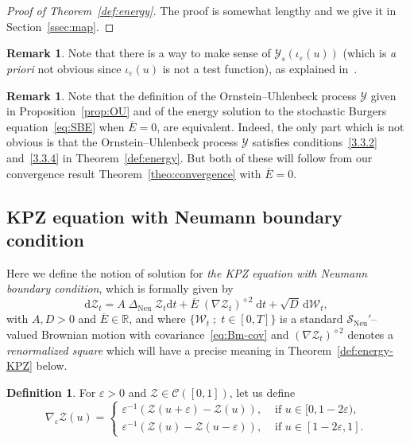 \documentclass[10pt]{amsart}
\theoremstyle{definition}\newtheorem{defi}[theo]{Definition}\newtheorem{rema}[theo]{Remark}\newtheorem{exam}[theo]{Example}\newtheorem{exem}[theo]{Example}\newtheorem{nota}[theo]{Notation}
\DeclareMathOperator{\Neu}{Neu}
\newcommand{\bb}[1]{{\mathbb #1}}
\newcommand{\mc}[1]{{\mathcal #1}}
\renewcommand{\mc}[1]{{\mathcal #1}}
\newcommand{\SN}{\ensuremath{\mc S_{\Neu}}}
\renewcommand{\bar}{\overline}
\newcommand*{\dd}{\mathrm{d}}
\newcommand*{\dt}{\dd t}
\begin{document}
\begin{proof}[Proof of Theorem~\ref{def:energy}] The proof is somewhat lengthy and we give it in Section~\ref{ssec:map}.
\end{proof}

\begin{rema}
Note that there is a way to make sense of $\mc Y_s(\iota_\varepsilon(u))$ (which is \emph{a priori} not obvious since $\iota_\varepsilon(u)$ is not a test function), as explained in~\cite[Remark~4]{gj2014}.
\end{rema}

\begin{rema}
Note that the definition of the Ornstein--Uhlenbeck process $\mc Y$ given in Proposition~\ref{prop:OU} and of the energy solution to the stochastic Burgers equation~\eqref{eq:SBE} when $\bar E=0$, are equivalent. Indeed, the only part which is not obvious is that the Ornstein--Uhlenbeck process $\mc Y$ satisfies conditions~\eqref{3.3.2} and~\eqref{3.3.4} in Theorem~\ref{def:energy}. But both of these will follow from our convergence result Theorem~\ref{theo:convergence} with $\bar E=0$.
\end{rema}

\subsection{KPZ equation with Neumann boundary condition}\label{ssec:kpz}
Here we define the notion of solution for \emph{the KPZ equation with Neumann boundary condition}, which is formally given by
\begin{equation}\label{eq:KPZ}
\dd\mc Z_t = A \;\Delta_{\Neu}\; \mc Z_t \dt + \bar{E}\; (\nabla \mc Z_t)^{\diamond 2} \;\dt + \sqrt{D} \,\dd\mc W_t,
\end{equation}
with $A,D > 0$ and $\bar{E} \in \bb R$, and where $\{\mc W_t\; ; \; t\in[0,T]\}$ is a standard $\SN'$--valued Brownian motion with covariance~\eqref{eq:Bm-cov} and $(\nabla \mc Z_t)^{\diamond 2}$ denotes a \emph{renormalized square} which will have a precise meaning in Theorem~\ref{def:energy-KPZ} below.
\begin{defi}

For $\varepsilon>0$ and $\mc Z\in\mc C([0,1])$, let us define
\begin{equation}\label{eq:nablah}
\nabla_{\varepsilon} \mc Z (u) =
\begin{cases}
\varepsilon^{-1} (\mc Z (u + \varepsilon) - \mc Z (u)), & \text{ if } u \in [0, 1 - 2
\varepsilon),\\
\varepsilon^{-1} (\mc Z(u) - \mc Z(u - \varepsilon)), & \text{ if } u \in [1 - 2
\varepsilon, 1].
\end{cases}
\end{equation}
\end{defi}
\end{document}
